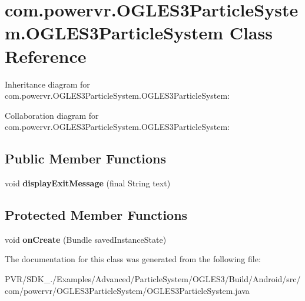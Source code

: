 \hypertarget{classcom_1_1powervr_1_1_o_g_l_e_s3_particle_system_1_1_o_g_l_e_s3_particle_system}{\section{com.\+powervr.\+O\+G\+L\+E\+S3\+Particle\+System.\+O\+G\+L\+E\+S3\+Particle\+System Class Reference}
\label{classcom_1_1powervr_1_1_o_g_l_e_s3_particle_system_1_1_o_g_l_e_s3_particle_system}
}


Inheritance diagram for com.\+powervr.\+O\+G\+L\+E\+S3\+Particle\+System.\+O\+G\+L\+E\+S3\+Particle\+System\+:


Collaboration diagram for com.\+powervr.\+O\+G\+L\+E\+S3\+Particle\+System.\+O\+G\+L\+E\+S3\+Particle\+System\+:
\subsection*{Public Member Functions}
\begin{DoxyCompactItemize}
\item 
\hypertarget{classcom_1_1powervr_1_1_o_g_l_e_s3_particle_system_1_1_o_g_l_e_s3_particle_system_a90c490473aef36134755c06e031530ab}{void {\bfseries display\+Exit\+Message} (final String text)}\label{classcom_1_1powervr_1_1_o_g_l_e_s3_particle_system_1_1_o_g_l_e_s3_particle_system_a90c490473aef36134755c06e031530ab}

\end{DoxyCompactItemize}
\subsection*{Protected Member Functions}
\begin{DoxyCompactItemize}
\item 
\hypertarget{classcom_1_1powervr_1_1_o_g_l_e_s3_particle_system_1_1_o_g_l_e_s3_particle_system_aa785aeaacfa432b57bfea57c9f1de8ca}{void {\bfseries on\+Create} (Bundle saved\+Instance\+State)}\label{classcom_1_1powervr_1_1_o_g_l_e_s3_particle_system_1_1_o_g_l_e_s3_particle_system_aa785aeaacfa432b57bfea57c9f1de8ca}

\end{DoxyCompactItemize}


The documentation for this class was generated from the following file\+:\begin{DoxyCompactItemize}
\item 
P\+V\+R/\+S\+D\+K\+\_./\+Examples/\+Advanced/\+Particle\+System/\+O\+G\+L\+E\+S3/\+Build/\+Android/src/com/powervr/\+O\+G\+L\+E\+S3\+Particle\+System/O\+G\+L\+E\+S3\+Particle\+System.\+java\end{DoxyCompactItemize}
